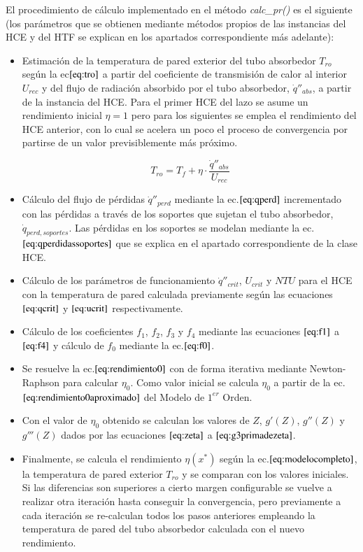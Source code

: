 El procedimiento de cálculo implementado en el método \emph{calc\_pr()} es el siguiente (los parámetros que se obtienen mediante métodos propios de las instancias del HCE y del HTF se explican en los apartados correspondiente más adelante): 
\begin{itemize}
\item
Estimación de la temperatura de pared exterior del tubo absorbedor \(T_{ro}\) según la ec\(\eqref{eq:tro}\) a partir del coeficiente de transmisión de calor al interior \(U_{rec}\) y del flujo de radiación absorbido por el tubo absorbedor, \(\dot q''_{abs}\), a partir de la instancia del HCE. Para el primer HCE del lazo se asume un rendimiento inicial \(\eta=1\) pero para los siguientes se emplea el rendimiento del HCE anterior, con lo cual se acelera un poco el proceso de convergencia por partirse de un valor previsiblemente más próximo.

\begin{equation}
    T_{ro} = T_f + \eta \cdot \frac{\dot q''_{abs}}{U_{rec}}
    \label{eq:tro}
\end{equation}

\item
  Cálculo del flujo de pérdidas \(\dot q''_{perd}\) mediante la   ec.\(\eqref{eq:qperd}\) incrementado con las pérdidas a través de los   soportes que sujetan el tubo absorbedor, \(\dot q_{perd,soportes}\).   Las pérdidas en los soportes se modelan mediante la   ec.\(\eqref{eq:qperdidassoportes}\) que se explica en el apartado   correspondiente de la clase HCE.
\item
  Cálculo de los parámetros de funcionamiento \(\dot q''_{crit}\),   \(U_{crit}\) y \(NTU\) para el HCE con la temperatura de pared   calculada previamente según las ecuaciones \(\eqref{eq:qcrit}\) y   \(\eqref{eq:ucrit}\) respectivamente.
\item
  Cálculo de los coeficientes \(f_1\), \(f_2\), \(f_3\) y \(f_4\)   mediante las ecuaciones \(\eqref{eq:f1}\) a \(\eqref{eq:f4}\) y   cálculo de \(f_0\) mediante la ec.\(\eqref{eq:f0}\).
\item
  Se resuelve la ec.\(\eqref{eq:rendimiento0}\) con de forma iterativa   mediante Newton-Raphson para calcular \(\eta_0\). Como valor inicial   se calcula \(\eta_0\) a partir de la   ec.\(\eqref{eq:rendimiento0aproximado}\) del Modelo de \(1^{er}\)  Orden.
\item
  Con el valor de \(\eta_0\) obtenido se calculan los valores de \(Z\),   \(g'(Z)\), \(g''(Z)\) y \(g'''(Z)\) dados por las ecuaciones   \(\eqref{eq:zeta}\) a \(\eqref{eq:g3primadezeta}\). 
\item
  Finalmente, se calcula el rendimiento \(\eta(x^*)\) según la   ec.\(\eqref{eq:modelocompleto}\), la temperatura de pared exterior   \(T_{ro}\) y se comparan con los valores iniciales. Si las diferencias   son superiores a cierto margen configurable se vuelve a realizar otra   iteración hasta conseguir la convergencia, pero previamente a cada iteración se re-calculan todos los pasos anteriores empleando la   temperatura de pared del tubo absorbedor calculada con el nuevo rendimiento. 
\end{itemize}

